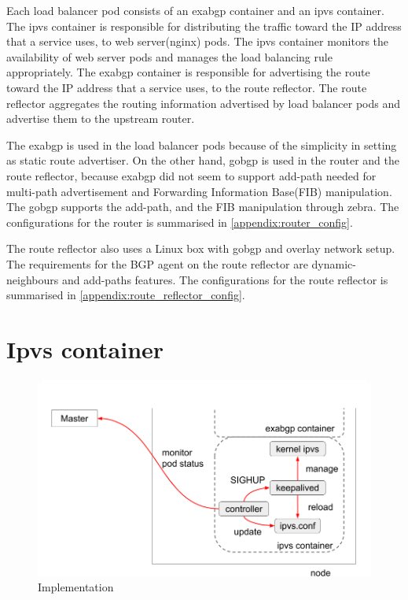 Each load balancer pod consists of an exabgp container and an ipvs container.
The ipvs container is responsible for distributing the traffic toward the IP address that a service uses, to web server(nginx) pods.
The ipvs container monitors the availability of web server pods and manages the load balancing rule appropriately.
The exabgp container is responsible for advertising the route toward the IP address that a service uses, to the route reflector.
The route reflector aggregates the routing information advertised by load balancer pods and advertise them to the upstream router.

The exabgp is used in the load balancer pods because of the simplicity in setting as static route advertiser.
On the other hand, gobgp is used in the router and the route reflector, because exabgp did not seem to support add-path\cite{rfc7911} needed for multi-path advertisement and Forwarding Information Base(FIB) manipulation\cite{exa-networks_2018}.
The gobgp supports the add-path, and the FIB manipulation through zebra\cite{osrg_gobgp_zebra}.
The configurations for the router is summarised in \ref{appendix:router_config}.

The route reflector also uses a Linux box with gobgp and overlay network setup.
The requirements for the BGP agent on the route reflector are dynamic-neighbours and add-paths features.
The configurations for the route reflector is summarised in \ref{appendix:route_reflector_config}.

\section{Ipvs container}\label{sec:ipvs}

\begin{figure}
\includegraphics[width=0.8\columnwidth]{Figs/ipvs-ingress-schem}
\caption{Implementation}
\label{fig:IPVS-ingress-schem}
\end{figure}


